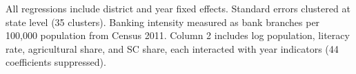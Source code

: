 \begin{table}[htbp]
   \par \raggedright 
   All regressions include district and year fixed effects. Standard errors clustered at state level (35 clusters). Banking intensity measured as bank branches per 100,000 population from Census 2011. Column 2 includes log population, literacy rate, agricultural share, and SC share, each interacted with year indicators (44 coefficients suppressed).
\end{table}


